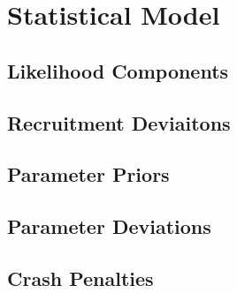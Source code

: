 \documentclass[11pt,
  english,
  letterpaper,
]{article}
\begin{document}
\leavevmode\tagmcend\tagstructend


\hypertarget{statistical-model}{%
\section{Statistical Model}\label{statistical-model}}

\leavevmode\tagmcend\tagstructend


\hypertarget{likelihood-components}{%
\subsection{Likelihood Components}\label{likelihood-components}}

\leavevmode\tagmcend\tagstructend


\hypertarget{recruitment-deviaitons}{%
\subsection{Recruitment Deviaitons}\label{recruitment-deviaitons}}

\leavevmode\tagmcend\tagstructend


\hypertarget{parameter-priors}{%
\subsection{Parameter Priors}\label{parameter-priors}}

\leavevmode\tagmcend\tagstructend


\hypertarget{parameter-deviations}{%
\subsection{Parameter Deviations}\label{parameter-deviations}}

\leavevmode\tagmcend\tagstructend


\hypertarget{crash-penalties}{%
\subsection{Crash Penalties}\label{crash-penalties}}
\end{document}
